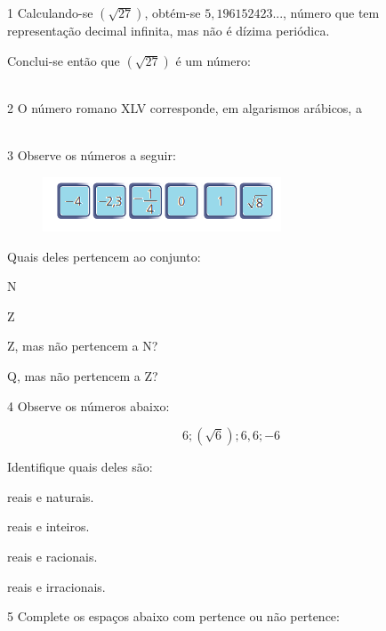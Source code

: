 \num{1} Calculando-se $(\sqrt{27})$, obtém-se $5,196152423$..., número que tem
representação decimal infinita, mas não é dízima periódica.

Conclui-se então que $(\sqrt{27})$ é um número:

\\


\num{2} O número romano XLV corresponde, em algarismos arábicos, a

\\

\num{3} Observe os números a seguir:

\begin{figure}[H]
\centering\includegraphics[width=2.79167in,height=0.63542in]{./imgSAEB_8_MAT/media/image1.png}
\end{figure}

Quais deles pertencem ao conjunto:


\begin{escolha}
\item N 
\item Z 
\item Z, mas não pertencem a N? 
\item Q, mas não pertencem a Z? 
\end{escolha}
\num{4} Observe os números abaixo:

$$6; (\sqrt{6}); 6,6; -6$$


Identifique quais deles são:
\begin{escolha}
\item reais e naturais.
\item reais e inteiros.
\item reais e racionais.
\item reais e irracionais.
\end{escolha}


\num{5} Complete os espaços abaixo com pertence ou não pertence:


